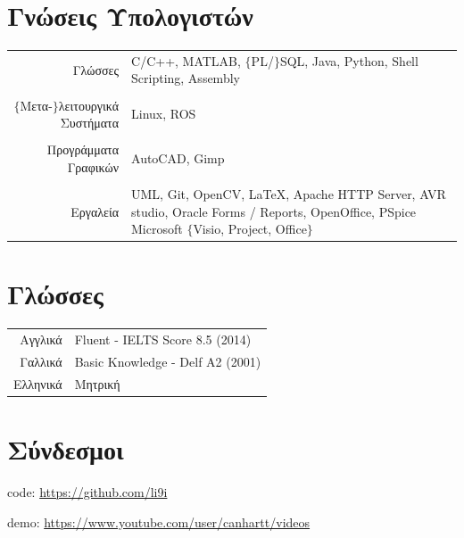 \documentclass[a4paper,10pt,twoside]{article}
\begin{document}
\section{Γνώσεις Υπολογιστών}

\begin{tabular}{rp{9cm}}
Γλώσσες & C/C++, MATLAB, $\{$PL/$\}$SQL, Java, Python, Shell Scripting, Assembly \\
&\\
$\{$Μετα-$\}$λειτουργικά Συστήματα & Linux, ROS \\
&\\
Προγράμματα Γραφικών & AutoCAD, Gimp\\
&\\
Εργαλεία & UML, Git, OpenCV, \LaTeX, Apache HTTP Server, AVR studio,
   Oracle Forms / Reports, OpenOffice, PSpice
   Microsoft $\{$Visio, Project, Office$\}$
\end{tabular}



\section{Γλώσσες}

\begin{tabular}{rp{12cm}}
Αγγλικά & Fluent - IELTS Score 8.5 (2014) \\
Γαλλικά & Basic Knowledge - Delf A2 (2001) \\
Ελληνικά & Μητρική
\end{tabular}



\section{Σύνδεσμοι}
code: \url{https://github.com/li9i}

demo: \url{https://www.youtube.com/user/canhartt/videos}
\end{document}
